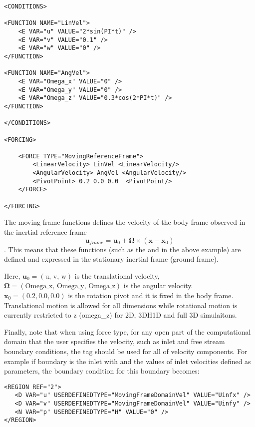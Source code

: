 \begin{lstlisting}[style=XMLStyle]
<CONDITIONS>

<FUNCTION NAME="LinVel">
    <E VAR="u" VALUE="2*sin(PI*t)" />
    <E VAR="v" VALUE="0.1" />
    <E VAR="w" VALUE="0" />
</FUNCTION>

<FUNCTION NAME="AngVel">
    <E VAR="Omega_x" VALUE="0" />
    <E VAR="Omega_y" VALUE="0" />
    <E VAR="Omega_z" VALUE="0.3*cos(2*PI*t)" />
</FUNCTION>

</CONDITIONS>

<FORCING>

    <FORCE TYPE="MovingReferenceFrame">
        <LinearVelocity> LinVel <LinearVelocity/>
        <AngularVelocity> AngVel <AngularVelocity/>
        <PivotPoint> 0.2 0.0 0.0  <PivotPoint/>
    </FORCE>

</FORCING>
\end{lstlisting}


The moving frame functions defines the velocity of the body frame observed in the inertial reference frame $$\mathbf{u}_{frame} = \mathbf{u}_0 + \mathbf{\Omega}\times (\mathbf{x}-\mathbf{x}_0)$$. This means that these functions (such as the  and  in the above example) are defined and expressed in the stationary inertial frame (ground frame).

Here, $\mathbf{u}_0 = (\text{u, v, w})$ is the translational velocity, $\mathbf{\Omega}=(\text{Omega\_x, Omega\_y, Omega\_z})$ is the angular velocity.
$\mathbf{x}_0=(0.2, 0.0, 0.0)$ is the rotation pivot and it is fixed in the body frame.
Translational motion is allowed for all dimensions while rotational motion is currently restricted to z (omega\_z) for 2D, 3DH1D and full 3D simulaitons.

Finally, note that when using  force type, for any open part of the computational domain that the user specifies the velocity, such as inlet and free stream boundary conditions, the  tag should be used for all of velocity components. For example if boundary  is the inlet with  and  the values of inlet velocities defined as parameters, the boundary condition for this boundary becomes:

\begin{lstlisting}[style=XMLStyle]
<REGION REF="2"> 
   <D VAR="u" USERDEFINEDTYPE="MovingFrameDomainVel" VALUE="Uinfx" />
   <D VAR="v" USERDEFINEDTYPE="MovingFrameDomainVel" VALUE="Uinfy" />
   <N VAR="p" USERDEFINEDTYPE="H" VALUE="0" />  
</REGION>
\end{lstlisting}

